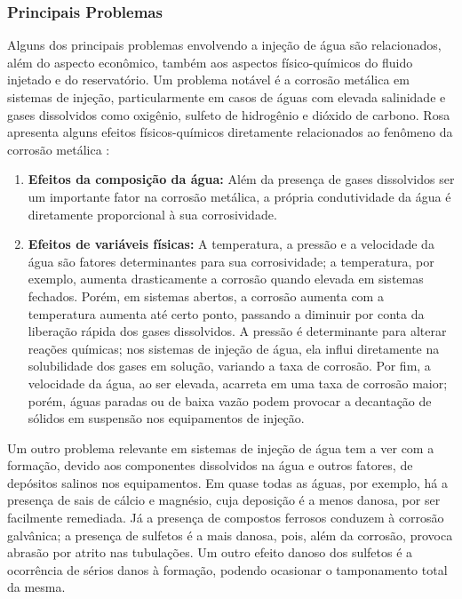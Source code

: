 \subsubsection{Principais Problemas}
Alguns dos principais problemas envolvendo a inje\c{c}\~{a}o de \'{a}gua s\~{a}o relacionados, al\'{e}m do aspecto econ\^{o}mico, tamb\'{e}m aos aspectos f\'{i}sico-qu\'{i}micos do fluido injetado e do reservat\'{o}rio. Um problema not\'{a}vel \'{e} a corros\~{a}o met\'{a}lica em sistemas de inje\c{c}\~{a}o, particularmente em casos de \'{a}guas com elevada salinidade e gases dissolvidos como oxig\^{e}nio, sulfeto de hidrog\^{e}nio e di\'{o}xido de carbono. Rosa apresenta alguns efeitos f\'{i}sicos-qu\'{i}micos diretamente relacionados ao fen\^{o}meno da corros\~{a}o met\'{a}lica \cite[pp. 662-663]{engres}:

\begin{enumerate}
\item \textbf{Efeitos da composi\c{c}\~{a}o da \'{a}gua:} Al\'{e}m da presen\c{c}a de gases dissolvidos ser um importante fator na corros\~{a}o met\'{a}lica, a pr\'{o}pria condutividade da \'{a}gua \'{e} diretamente proporcional \`{a} sua corrosividade.

\item \textbf{Efeitos de vari\'{a}veis f\'{i}sicas:} A temperatura, a press\~{a}o e a velocidade da \'{a}gua s\~{a}o fatores determinantes para sua corrosividade; a temperatura, por exemplo, aumenta drasticamente a corros\~{a}o quando elevada em sistemas fechados. Por\'{e}m, em sistemas abertos, a corros\~{a}o aumenta com a temperatura aumenta at\'{e} certo ponto, passando a diminuir por conta da libera\c{c}\~{a}o r\'{a}pida dos gases dissolvidos. A press\~{a}o \'{e} determinante para alterar rea\c{c}\~{o}es qu\'{i}micas; nos sistemas de inje\c{c}\~{a}o de \'{a}gua, ela influi diretamente na solubilidade dos gases em solu\c{c}\~{a}o, variando a taxa de corros\~{a}o. Por fim, a velocidade da \'{a}gua, ao ser elevada, acarreta em uma taxa de corros\~{a}o maior; por\'{e}m, \'{a}guas paradas ou de baixa vaz\~{a}o podem provocar a decanta\c{c}\~{a}o de s\'{o}lidos em suspens\~{a}o nos equipamentos de inje\c{c}\~{a}o.
\end{enumerate}

Um outro problema relevante em sistemas de inje\c{c}\~{a}o de \'{a}gua tem a ver com a forma\c{c}\~{a}o, devido aos componentes dissolvidos na \'{a}gua e outros fatores, de dep\'{o}sitos salinos nos equipamentos. Em quase todas as \'{a}guas, por exemplo, h\'{a} a presen\c{c}a de sais de c\'{a}lcio e magn\'{e}sio, cuja deposi\c{c}\~{a}o \'{e} a menos danosa, por ser facilmente remediada. J\'{a} a presen\c{c}a de compostos ferrosos conduzem \`{a} corros\~{a}o galv\^{a}nica; a presen\c{c}a de sulfetos \'{e} a mais danosa, pois, al\'{e}m da corros\~{a}o, provoca abras\~{a}o por atrito nas tubula\c{c}\~{o}es. Um outro efeito danoso dos sulfetos \'{e} a ocorr\^{e}ncia de s\'{e}rios danos \`{a} forma\c{c}\~{a}o, podendo ocasionar o tamponamento total da mesma.

